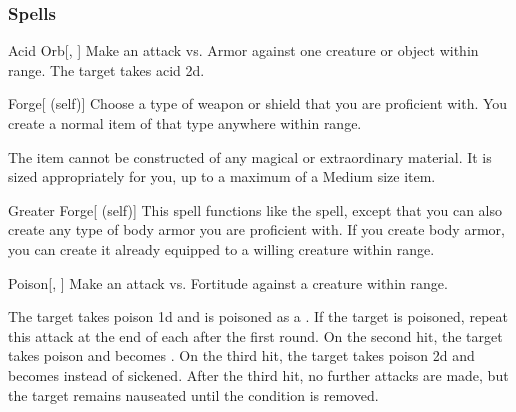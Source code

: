 \subsubsection{Spells}


\lowercase{\hypertarget{spell:Acid Orb}{}}\label{spell:Acid Orb}
\begin{apability}[\nth{1}]{\hypertarget{spell:Acid Orb}{Acid Orb}}[, ]
Make an attack vs. Armor against one creature or object within \rngmed range.
\hit The target takes acid  \plus2d.
\end{apability}
\vspace{0.25em}



\lowercase{\hypertarget{spell:Forge}{}}\label{spell:Forge}
\begin{attuneability}[\nth{1}]{\hypertarget{spell:Forge}{Forge}}[ (self)]
Choose a type of weapon or shield that you are proficient with.
You create a normal item of that type anywhere within \rngclose range.

The item cannot be constructed of any magical or extraordinary material.
It is sized appropriately for you, up to a maximum of a Medium size item.
\end{attuneability}
\vspace{0.25em}



\lowercase{\hypertarget{spell:Greater Forge}{}}\label{spell:Greater Forge}
\begin{attuneability}[\nth{2}]{\hypertarget{spell:Greater Forge}{Greater Forge}}[ (self)]
This spell functions like the  spell, except that you can also create any type of body armor you are proficient with.
If you create body armor, you can create it already equipped to a willing creature within range.
\end{attuneability}
\vspace{0.25em}



\lowercase{\hypertarget{spell:Poison}{}}\label{spell:Poison}
\begin{apability}[\nth{2}]{\hypertarget{spell:Poison}{Poison}}[, ]
Make an attack vs. Fortitude against a creature within \rngmed range.

\hit The target takes poison  \plus1d and is poisoned as a .
If the target is poisoned, repeat this attack at the end of each  after the first round.
On the second hit, the target takes poison  and becomes .
On the third hit, the target takes poison  \plus2d and becomes  instead of sickened.
After the third hit, no further attacks are made, but the target remains nauseated until the condition is removed.
\end{apability}
\vspace{0.25em}



